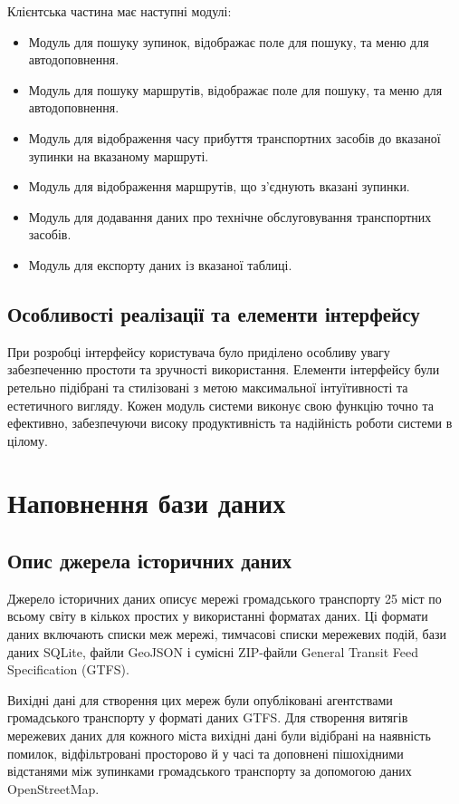 \documentclass[oneside,14pt]{extarticle}
\begin{document}
Клієнтська частина має наступні модулі:
\begin{itemize}
\item Модуль для пошуку зупинок, відображає поле для пошуку, та меню для автодоповнення.
\item Модуль для пошуку маршрутів, відображає поле для пошуку, та меню для автодоповнення.
\item Модуль для відображення часу прибуття транспортних засобів до вказаної зупинки на вказаному маршруті.
\item Модуль для відображення маршрутів, що з'єднують вказані зупинки.
\item Модуль для додавання даних про технічне обслуговування транспортних засобів.
\item Модуль для експорту даних із вказаної таблиці.
\end{itemize}

\subsection{Особливості реалізації та елементи інтерфейсу}
При розробці інтерфейсу користувача було приділено особливу увагу забезпеченню простоти та зручності використання. Елементи інтерфейсу були ретельно підібрані та стилізовані з метою максимальної інтуїтивності та естетичного вигляду. Кожен модуль системи виконує свою функцію точно та ефективно, забезпечуючи високу продуктивність та надійність роботи системи в цілому.

\newpage

\section{Наповнення бази даних}
\subsection{Опис джерела історичних даних}
Джерело історичних даних описує мережі громадського транспорту 25 міст по всьому світу в кількох простих у використанні форматах даних. Ці формати даних включають списки меж мережі, тимчасові списки мережевих подій, бази даних SQLite, файли GeoJSON і сумісні ZIP-файли General Transit Feed Specification (GTFS).

Вихідні дані для створення цих мереж були опубліковані агентствами громадського транспорту у форматі даних GTFS. Для створення витягів мережевих даних для кожного міста вихідні дані були відібрані на наявність помилок, відфільтровані просторово й у часі та доповнені пішохідними відстанями між зупинками громадського транспорту за допомогою даних OpenStreetMap.
\end{document}
